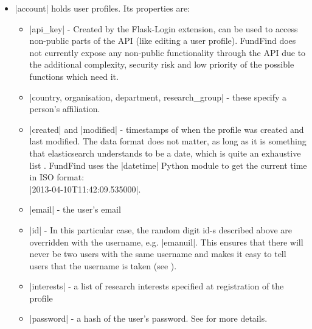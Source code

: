 \begin{itemize}
\item |account| holds user profiles. Its properties are:
	\begin{itemize}
	\item |api_key| - Created by the Flask-Login extension, can be used to access non-public parts of the API (like editing a user profile). FundFind does not currently expose any non-public functionality through the API due to the additional complexity, security risk and low priority of the possible functions which need it.
	\item |country, organisation, department, research_group| - these specify a person's affiliation.
	
	\item |created| and |modified| - timestamps of when the profile was created and last modified. The data format does not matter, as long as it is something that elasticsearch understands to be a date, which is quite an exhaustive list \cite{es-dateformats}. FundFind uses the |datetime| Python module to get the current time in ISO format: 
	\\ |2013-04-10T11:42:09.535000|.
	
	\item |email| - the user's email
	\item |id| - In this particular case, the random digit id-s described above are overridden with the username, e.g. |emanuil|. This ensures that there will never be two users with the same username and makes it easy to tell users that the username is taken (see ).
	\item |interests| - a list of research interests specified at registration of the profile
	\item |password| - a hash of the user's password. See  for more details.
	\end{itemize}


\end{itemize}
